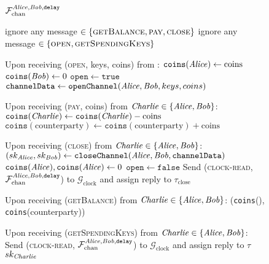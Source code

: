 \begin{figure}[H]
  \begin{systembox}{$\mathcal{F}_{\mathrm{chan}}^{\mathit{Alice}, \mathit{Bob}, \mathtt{delay}}$}
    \begin{algorithmic}[1]
        \State ignore any message $\in \{\textsc{getBalance}, \textsc{pay},
        \textsc{close}\}$
      \Else
        \State ignore any message $\in \{\textsc{open},
        \textsc{getSpendingKeys}\}$
      \EndIf
      \Statex

      \State Upon receiving (\textsc{open}, keys, coins) from \alice:
      \Indent
        \State $\mathtt{coins}(\mathit{Alice}) \gets \mathrm{coins}$
        \State $\mathtt{coins}(\mathit{Bob}) \gets 0$
        \State $\mathtt{open} \gets \mathtt{true}$
        \State $\mathtt{channelData} \gets \mathtt{openChannel}(\mathit{Alice}, \mathit{Bob},
        keys, coins)$ 
      \EndIndent
      \Statex

      \State Upon receiving (\textsc{pay}, coins) from $\mathit{Charlie} \in \{\mathit{Alice},
      \mathit{Bob}\}$:
      \Indent
          \State $\mathtt{coins}(\mathit{Charlie}) \gets \mathtt{coins}(\mathit{Charlie}) -
          \mathrm{coins}$
          \State $\mathtt{coins}(\mathrm{counterparty}) \gets
          \mathtt{coins}(\mathrm{counterparty}) + \mathrm{coins}$
        \EndIf
      \EndIndent
      \Statex

      \State Upon receiving (\textsc{close}) from $\mathit{Charlie} \in \{\mathit{Alice},
      \mathit{Bob}\}$:
      \Indent
        \State $(sk_{\mathit{Alice}}, sk_{\mathit{Bob}}) \gets \mathtt{closeChannel}(\mathit{Alice},
        \mathit{Bob}, \mathtt{channelData})$ 
        \State $\mathtt{coins}(\mathit{Alice}), \mathtt{coins}(\mathit{Alice}) \gets 0$
        \State $\mathtt{open} \gets \mathtt{false}$
        \State Send (\textsc{clock-read}, $\mathcal{F}_{\mathrm{chan}}^{\mathit{Alice}, \mathit{Bob}, \mathtt{delay}}$) to
        $\mathcal{G}_{\mathrm{clock}}$ and assign reply to
        $\tau_{\mathrm{close}}$
      \EndIndent
      \Statex

      \State Upon receiving (\textsc{getBalance}) from $\mathit{Charlie} \in \{\mathit{Alice},
      \mathit{Bob}\}$:
      \Indent
        \State \Return (\texttt{coins}(\charlie), \texttt{coins}(counterparty))
      \EndIndent
      \Statex

      \State Upon receiving (\textsc{getSpendingKeys}) from $\mathit{Charlie} \in \{\mathit{Alice},
      \mathit{Bob}\}$:
      \Indent
        \State Send (\textsc{clock-read}, $\mathcal{F}_{\mathrm{chan}}^{\mathit{Alice}, \mathit{Bob}, \mathtt{delay}}$) to
        $\mathcal{G}_{\mathrm{clock}}$ and assign reply to $\tau$
          \State \Return $sk_{\mathit{Charlie}}$
        \EndIf
      \EndIndent
    \end{algorithmic}
  \end{systembox}
  \caption{}
  \label{alg:chanfunc}
\end{figure}
